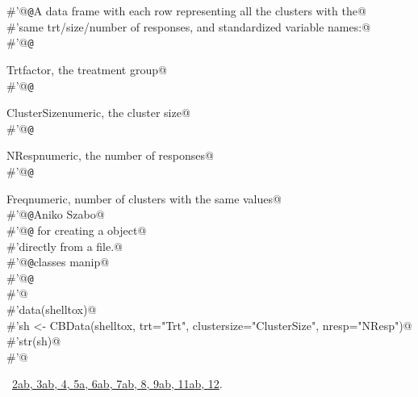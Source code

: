 \documentclass[reqno]{amsart}
\renewcommand{\NWlink}[2]{\hyperlink{#1}{#2}}
\begin{document}
\begin{flushleft}
\begin{list}{}{}
\mbox{}\verb@#'@{\tt @}\verb@return A data frame with each row representing all the clusters with the@\\
\mbox{}\verb@#'same trt/size/number of responses, and standardized variable names:@\\
\mbox{}\verb@#'@{\tt @}\verb@return \item{Trt}{factor, the treatment group}@\\
\mbox{}\verb@#'@{\tt @}\verb@return \item{ClusterSize}{numeric, the cluster size}@\\
\mbox{}\verb@#'@{\tt @}\verb@return \item{NResp}{numeric, the number of responses}@\\
\mbox{}\verb@#'@{\tt @}\verb@return \item{Freq}{numeric, number of clusters with the same values}@\\
\mbox{}\verb@#'@{\tt @}\verb@author Aniko Szabo@\\
\mbox{}\verb@#'@{\tt @}\verb@seealso {} for creating a  object@\\
\mbox{}\verb@#'directly from a file.@\\
\mbox{}\verb@#'@{\tt @}\verb@keywords classes manip@\\
\mbox{}\verb@#'@{\tt @}\verb@examples@\\
\mbox{}\verb@#'@\\
\mbox{}\verb@#'data(shelltox)@\\
\mbox{}\verb@#'sh <- CBData(shelltox, trt="Trt", clustersize="ClusterSize", nresp="NResp")@\\
\mbox{}\verb@#'str(sh)@\\
\mbox{}\verb@#'@\\
\mbox{}\verb@@{\NWsep}
\end{list}
\vspace{-1.5ex}
\footnotesize
\begin{list}{}{\setlength{\itemsep}{-\parsep}\setlength{\itemindent}{-\leftmargin}}
\item \NWtxtFileDefBy\ \NWlink{nuweb2a}{2a}\NWlink{nuweb2b}{b}\NWlink{nuweb3a}{, 3a}\NWlink{nuweb3b}{b}\NWlink{nuweb4}{, 4}\NWlink{nuweb5a}{, 5a}\NWlink{nuweb6a}{, 6a}\NWlink{nuweb6b}{b}\NWlink{nuweb7a}{, 7a}\NWlink{nuweb7b}{b}\NWlink{nuweb8}{, 8}\NWlink{nuweb9a}{, 9a}\NWlink{nuweb9b}{b}\NWlink{nuweb11a}{, 11a}\NWlink{nuweb11b}{b}\NWlink{nuweb12}{, 12}.

\item{}
\end{list}
\vspace{4ex}
\end{flushleft}
\end{document}

